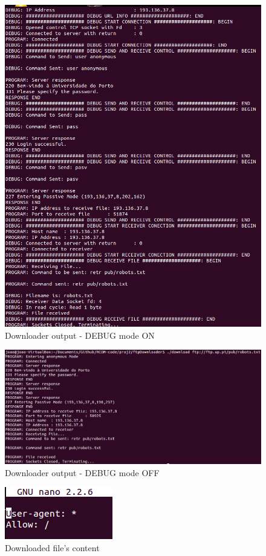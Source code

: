 \documentclass[a4paper]{article}
\begin{document}
	\begin{figure}[H]
	\begin{center}
  	\includegraphics[width=\linewidth]{ftp1.png}
  	\caption{Downloader output - DEBUG mode ON}
  	\label{fig:Downloader output - DEBUG mode ON}
	\end{center}
	\end{figure}

	\begin{figure}[H]
	\begin{center}
  	\includegraphics[width=\linewidth]{ftp2.png}
  	\caption{Downloader output - DEBUG mode OFF}
  	\label{fig:Downloader output - DEBUG mode OFF}
	\end{center}
	\end{figure}

	\begin{figure}[H]
	\begin{center}
  	\includegraphics[width=0.2\linewidth]{ftp3.png}
  	\caption{Downloaded file's content}
  	\label{fig:Downloaded file's content}
	\end{center}
	\end{figure}

	
\end{document}
